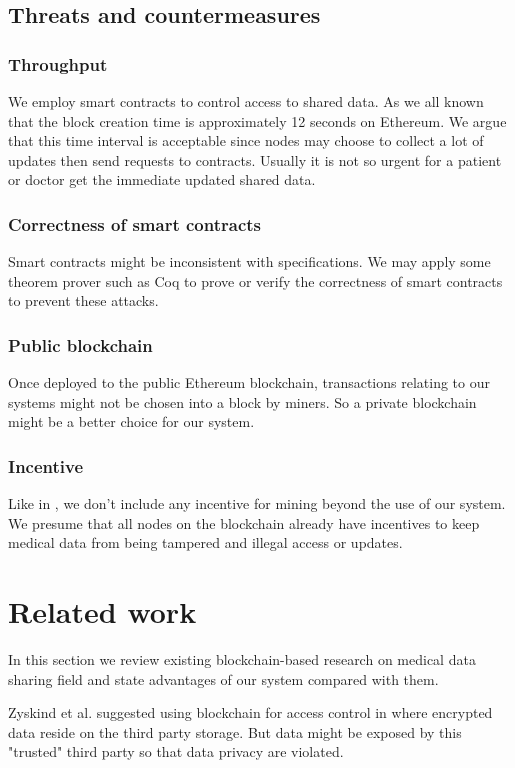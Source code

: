 \documentclass[conference]{IEEEtran}
\begin{document}
\subsection{Threats and countermeasures}
\subsubsection{Throughput}
We employ smart contracts to control access to shared data. As we all known that the block creation time is approximately 12 seconds on Ethereum. We argue that this time interval is acceptable since nodes may choose to collect a lot of updates then send requests to contracts. Usually it is not so urgent for a patient or doctor get the immediate updated shared data.

\subsubsection{Correctness of smart contracts }
Smart contracts might be inconsistent with specifications. We may apply some theorem prover such as Coq\cite{huet2004coq} to prove or verify the correctness of smart contracts to prevent these attacks.

\subsubsection{Public blockchain}
Once deployed to the public Ethereum blockchain, transactions relating to our systems might not be chosen into a block by miners. So a private blockchain might be a better choice for our system.

\subsubsection{Incentive}
Like in \cite{dagher2018ancile}, we don't include any incentive for mining beyond the use of our system. We presume that all nodes on the blockchain already have incentives to keep medical data from being tampered and illegal access or updates.

\section{Related work}
\label{related work}
In this section we review existing blockchain-based research on medical data sharing field and state advantages of our system compared with them.

Zyskind et al. suggested using blockchain for access control in \cite{zyskind2015decentralizing} where encrypted data reside on the third party storage. But data might be exposed by this "trusted" third party so that data privacy are violated.
\end{document}
